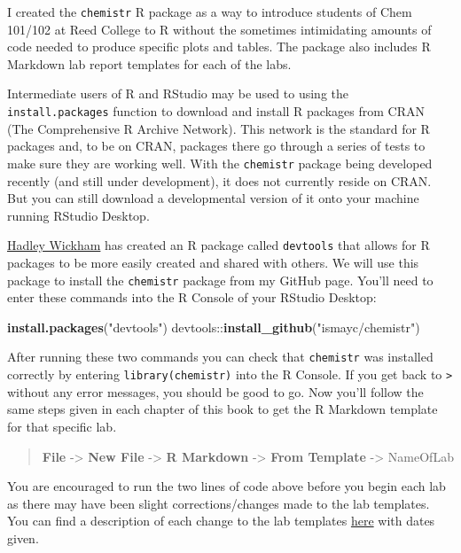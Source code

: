 \documentclass[]{tufte-book}
\newenvironment{Shaded}{\begin{snugshade}}{\end{snugshade}}
\newcommand{\KeywordTok}[1]{\textcolor[rgb]{0.13,0.29,0.53}{\textbf{{#1}}}}
\newcommand{\StringTok}[1]{\textcolor[rgb]{0.31,0.60,0.02}{{#1}}}
\newcommand{\NormalTok}[1]{{#1}}
\begin{document}
I created the \texttt{chemistr} R package as a way to introduce students
of Chem 101/102 at Reed College to R without the sometimes intimidating
amounts of code needed to produce specific plots and tables. The package
also includes R Markdown lab report templates for each of the labs.

Intermediate users of R and RStudio may be used to using the
\texttt{install.packages} function to download and install R packages
from CRAN (The Comprehensive R Archive Network). This network is the
standard for R packages and, to be on CRAN, packages there go through a
series of tests to make sure they are working well. With the
\texttt{chemistr} package being developed recently (and still under
development), it does not currently reside on CRAN. But you can still
download a developmental version of it onto your machine running RStudio
Desktop.

\href{http://hadley.nz/}{Hadley Wickham} has created an R package called
\texttt{devtools} that allows for R packages to be more easily created
and shared with others. We will use this package to install the
\texttt{chemistr} package from my GitHub page. You'll need to enter
these commands into the R Console of your RStudio Desktop:

\begin{Shaded}
\begin{Highlighting}[]
\KeywordTok{install.packages}\NormalTok{(}\StringTok{"devtools"}\NormalTok{)}
\NormalTok{devtools::}\KeywordTok{install_github}\NormalTok{(}\StringTok{"ismayc/chemistr"}\NormalTok{)}
\end{Highlighting}
\end{Shaded}

After running these two commands you can check that \texttt{chemistr}
was installed correctly by entering \texttt{library(chemistr)} into the
R Console. If you get back to \texttt{\textgreater{}} without any error
messages, you should be good to go. Now you'll follow the same steps
given in each chapter of this book to get the R Markdown template for
that specific lab.

\begin{quote}
\textbf{File} -\textgreater{} \textbf{New File} -\textgreater{}
\textbf{R Markdown} -\textgreater{} \textbf{From Template}
-\textgreater{} NameOfLab
\end{quote}

You are encouraged to run the two lines of code above before you begin
each lab as there may have been slight corrections/changes made to the
lab templates. You can find a description of each change to the lab
templates
\href{https://github.com/ismayc/chemistr/blob/master/NEWS.md}{here} with
dates given.
\end{document}
